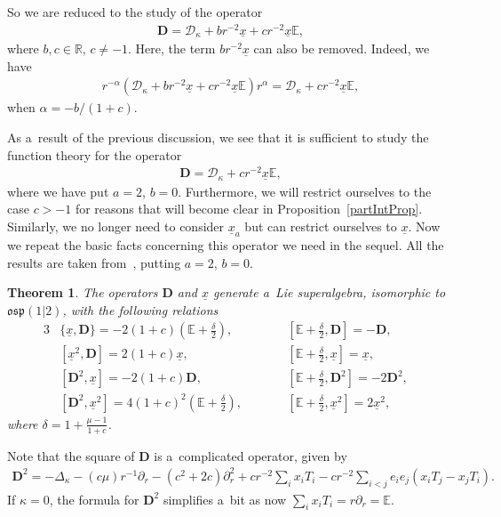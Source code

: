 \documentclass[11pt]{article}
\newtheorem{theorem}{Theorem}
\numberwithin{equation}{section}
\numberwithin{theorem}{section}
\numberwithin{proposition}{section}
\numberwithin{lemma}{section}
\numberwithin{corollary}{section}
\numberwithin{definition}{section}
\numberwithin{example}{section}
\numberwithin{remark}{section}
\numberwithin{note}{section}
\theoremstyle{remark}
\newcommand{\mR}{\mathbb{R}}
\newcommand{\mE}{\mathbb{E}}
\newcommand{\cD}{\mathcal{D}}
\newcommand{\dD}{\textbf{D}}
\newcommand{\ux}{\underline{x}}
\def\k{{\kappa}}
\begin{document}
So we are reduced to the study of the operator
\begin{gather*}
\dD=\cD_{\k}+b r^{-2}\ux+c r^{-2}\ux\mE,
\end{gather*}
where $b,c\in\mR$, $c\neq-1$.
Here, the term $b r^{-2}\ux$ can also be removed.
Indeed, we have
\begin{gather*}
r^{-\alpha}\left(\cD_{\k}+b r^{-2}\ux+c r^{-2}\ux\mE\right)r^{\alpha}=\cD_{\k}+c
r^{-2}\ux\mE,
\end{gather*}
when $\alpha=-b/(1+c)$.

As a~result of the previous discussion, we see that it is suf\/f\/icient to study the function theory
for the operator
\begin{gather*}
\dD=\cD_{\k}+c r^{-2}\ux\mE,
\end{gather*}
where we have put $a=2$, $b=0$.
Furthermore, we will restrict ourselves to the case $c>-1$ for reasons that will become clear in
Proposition~\ref{partIntProp}.
Similarly, we no longer need to consider $\ux_{a}$ but can restrict ourselves to $\ux$.
Now we repeat the basic facts concerning this operator we need in the sequel.
All the results are taken from~\cite{H12}, putting $a=2$, $b=0$.

\begin{theorem}\label{ospFamily}
The operators $\dD$ and $\ux$ generate a~Lie superalgebra, isomorphic to $\mathfrak{osp}(1|2)$,
with the following relations
\begin{alignat*}{3}
& \{\ux,\dD\}=-2(1+c)\left(\mE+\frac{\delta}{2}\right),\qquad&&
\left[\mE+\frac{\delta}{2},\dD\right]=-\dD,& \\
& \left[\ux^{2},\dD\right]=2(1+c)\ux,\qquad&&
\left[\mE+\frac{\delta}{2},\ux\right]=\ux,& \\
& \left[\dD^{2},\ux\right]=-2(1+c)\dD,\qquad&&
\left[\mE+\frac{\delta}{2},\dD^{2}\right]=-2\dD^{2},&\\
& \left[\dD^{2},\ux^{2}\right]=4(1+c)^{2}\left(\mE+\frac{\delta}{2}\right),\qquad&&
\left[\mE+\frac{\delta}{2},\ux^{2}\right]=2\ux^{2},&
\end{alignat*}
where $\delta=1+\frac{\mu-1}{1+c}$.
\end{theorem}

Note that the square of $\dD$ is a~complicated operator, given by
\begin{gather*}
\dD^{2}=-\Delta_{\k}-\left(c\mu\right)r^{-1}\partial_{r}
-\left(c^{2}+2c\right)\partial_{r}^{2}+c r^{-2}\sum_{i}x_{i}T_{i}
-c r^{-2}\sum_{i<j}e_{i}e_{j}(x_{i}T_{j}-x_{j}T_{i}).
\end{gather*}
If $\k=0$, the formula for $\dD^{2}$ simplif\/ies a~bit as now $\sum_{i}x_{i}T_{i}=r
\partial_{r}=\mE$.
\end{document}
